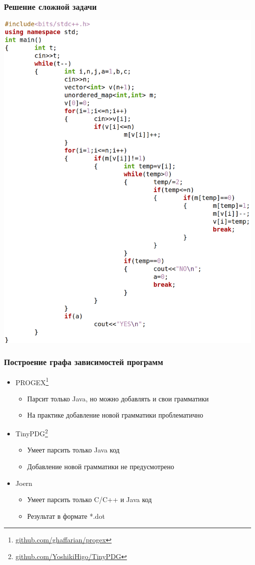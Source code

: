 \documentclass[10pt]{beamer}
\begin{document}
\begin{frame}[fragile]\frametitle{Решение сложной задачи}
		\includegraphics[scale=0.45]{example_d.png}
\end{frame}

\begin{frame}\frametitle{Построение графа зависимостей программ}
	\begin{itemize}
		\item PROGEX\footnote[11,frame]{\href{https://github.com/ghaffarian/progex}{\color{blue}github.com/ghaffarian/progex}}
		\begin{itemize}
			\item Парсит только Java, но можно добавлять и свои грамматики
			\item На практике добавление новой грамматики проблематично
		\end{itemize}
		\item TinyPDG\footnote[12,frame]{\href{https://github.com/YoshikiHigo/TinyPDG}{\color{blue}github.com/YoshikiHigo/TinyPDG}}
		\begin{itemize}
			\item Умеет парсить только Java код
			\item Добавление новой грамматики не предусмотрено
		\end{itemize}
		\item Joern
		\begin{itemize}
			\item Умеет парсить только C/C++ и Java код
			\item Результат в формате *.dot
		\end{itemize}
	\end{itemize}
\end{frame}
\end{document}
